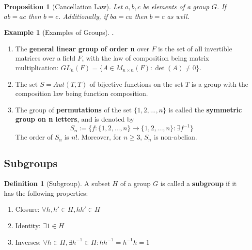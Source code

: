 \documentclass[12pt]{article}
\newtheorem{prop}[thm]{Proposition}
\theoremstyle{definition}
\newtheorem{defn}[thm]{Definition}
\newtheorem{eg}[thm]{Example}
\theoremstyle{remark}
\numberwithin{equation}{section}
\newcommand\B[1]{\textbf{ #1}}
\begin{document}
\begin{prop}[Cancellation Law]
        Let $a,b,c$ be elements of a group $G$. If $ab = ac$ then $b = c$. Additionally, if $ba = ca$ then $b = c$ as well.
\end{prop}

\vspace{15pt}

\begin{eg}[Examples of Groups]
        .\newline \begin{enumerate}
                \item The \B{general linear group of order n} over $F$ is the set of all invertible matrices over a field $F$, with the law of composition being matrix multiplication: $GL_n(F) = \{A \in M_{n\times n}(F): \det(A) \neq 0\}$.
                \item The set $S = Aut(T,T)$ of bijective functions on the set $T$ is a group with the composition law being function composition.
                \item The group of \B{permutations} of the set $\{1,2,...,n\}$ is called the \B{symmetric group on n letters}, and is denoted by \begin{equation}
                                S_n := \{f:\{1,2,...,n\}\rightarrow\{1,2,...,n\}: \exists f^{-1}\}
                \end{equation}
                        The order of $S_n$ is $n!$. Moreover, for $n \geq 3$, $S_n$ is non-abelian.
        \end{enumerate}
\end{eg}

\vspace{15pt}

\subsection{Subgroups}

\begin{defn}[Subgroup]
        A subset $H$ of a group $G$ is called a \B{subgroup} if it has the following properties:
        \begin{enumerate}
                \item Closure: $\forall h,h' \in H, hh' \in H$
                \item Identity: $\exists 1 \in H$
                \item Inverses: $\forall h \in H, \exists h^{-1} \in H:hh^{-1}=h^{-1}h=1$
        \end{enumerate}
\end{defn}
\end{document}
